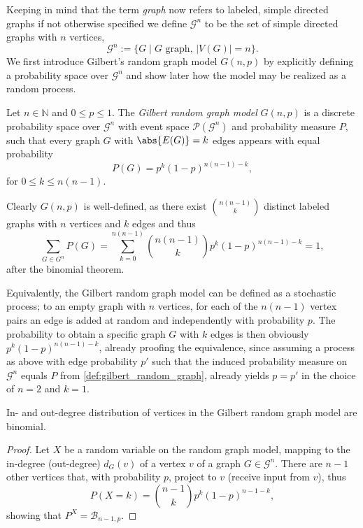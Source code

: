 Keeping in mind that the term \textit{graph} now refers to labeled,
simple directed graphs if not otherwise specified we define $\mathcal{G}^n$ to
be the set of simple directed graphs with $n$ vertices,
\[
\mathcal{G}^n := \{G \mid G\,\mathrm{\,graph},\, |V(G)| = n\}.
\]
We first introduce Gilbert's random graph model $G(n,p)$ by explicitly
defining a probability space over $\mathcal{G}^n$ and show later how
the model may be realized as a random process.

\begin{definition}
  \label{def:gilbert_random_graph} 
  Let $n\in\mathbb{N}$ and $0\leq p \leq 1$. The \textit{Gilbert
    random graph model} $G(n,p)$ is a discrete probability space over
  $\mathcal{G}^n$ with event space $\mathcal{P}(\mathcal{G}^n)$ and
  probability measure $P$, such that every graph $G$ with
  $\abs{E(G)}=k$ edges appears with equal probability%
  \[%
    P(G) = {p^k(1-p)^{n(n-1)-k}},%
  \]%
  for $0 \leq k \leq n(n-1)$. 
\end{definition}

\begin{remark}Clearly $G(n,p)$ is well-defined, as there exist $\binom{n(n-1)}{k}$
distinct labeled graphs with $n$ vertices and $k$ edges and thus 
\[
  \sum_{G \in G^n} P(G) =  \sum_{k=0}^{n(n-1)}  \binom{n(n-1)}{k}
  p^k(1-p)^{n(n-1)-k} = 1, %
\]
after the binomial theorem.
\end{remark}


Equivalently, the Gilbert random graph model can be defined as a
stochastic process;
to an empty graph with $n$ vertices, for each of the $n(n-1)$ vertex
pairs an edge is added at random and independently with probability
$p$. The probability to obtain a specific graph $G$ with $k$ edges is
then obviously $p^k(1-p)^{n(n-1)-k}$, already proofing the
equivalence, since assuming a process as above with edge probability
$p'$ such that the induced probability measure on $\mathcal{G}^n$ equals
$P$ from \ref{def:gilbert_random_graph}, already yields $p = p'$ in
the choice of $n=2$ and $k=1$. 

\begin{proposition}
  In- and out-degree distribution of vertices in the Gilbert random
  graph model are binomial.
\end{proposition}
%
\begin{proof}
  Let $X$ be a random variable on the random graph model, mapping to
  the in-degree (out-degree) $d_G(v)$ of a vertex $v$ of a graph $G
  \in \mathcal{G}^n$. There are $n-1$ other vertices that, with
  probability $p$, project to $v$ (receive input from $v$), thus
  \[
    P(X=k) = \binom{n-1}{k} p^k (1-p)^{n-1-k},%
  \]%
  showing that $P^X = \mathcal{B}_{n-1,p}$.
\end{proof}


